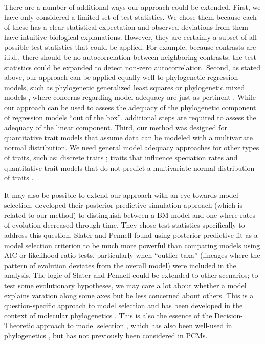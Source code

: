 There are a number of additional ways our approach could be extended. First, we have only considered a limited set of test statistics. We chose them because each of these has a clear statistical expectation and observed deviations from them have intuitive biological explanations. However, they are certainly a subset of all possible test statistics that could be applied. 
For example, because contrasts are i.i.d., there should be no autocorrelation between neighboring contrasts; the test statistics could be expanded to detect non-zero autocorrelation. Second, as stated above, our approach can be applied equally well to phylogenetic regression models, such as phylogenetic generalized least squares \citep{Grafen1989, MartinsHansen1997} or phylogenetic mixed models \citep{Lynch1991, Housworth2004, Hadfield2010}, where concerns regarding model adequacy are just as pertinent \citep{Hansen2012SysBio}. While our approach can be used to assess the adequacy of the phylogenetic component of regression models ``out of the box'', additional steps are required to assess the adequacy of the linear component.  Third, our method was designed for quantitative trait models that assume data can be modeled with a multivariate normal distribution. We need general model adequacy approaches for other types of traits, such as: discrete traits \citep[i.e., binary, multistate, ordinal; see][for recent discussions of this]{Beaulieu2013, Blackmon2014, MaddisonFitzJohn}; traits that influence speciation rates \citep[e.g.,][]{Maddison2007, FitzJohn2010} and quantitative trait models that do not predict a multivariate normal distribution of traits \citep{Landis2012, Landispreprint}.

It may also be possible to extend our approach with an eye towards model selection. \citet{SlaterPennell} developed their posterior predictive simulation approach (which is related to our method) to distinguish between a BM model and one where rates of evolution decreased through time. They chose test statistics specifically to address this question. Slater and Pennell found using posterior predictive fit as a model selection criterion to be much more powerful than comparing models using AIC or likelihood ratio tests, particularly when ``outlier taxa'' (lineages where the pattern of evolution deviates from the overall model) were included in the analysis. The logic of Slater and Pennell could be extended to other scenarios; to test some evolutionary hypotheses, we may care a lot about whether a model explains varation along some axes but be less concerned about others. This is a question-specific approach to model selection and has been developed in the context of molecular phylogenetics \citep{Bollback2002, Lewis2013}. This is also the essence of the Decision-Theoretic approach to model selection \citep{Robert2007}, which has also been well-used in phylogenetics \citep{Minin2003}, but has not previously been considered in PCMs.


